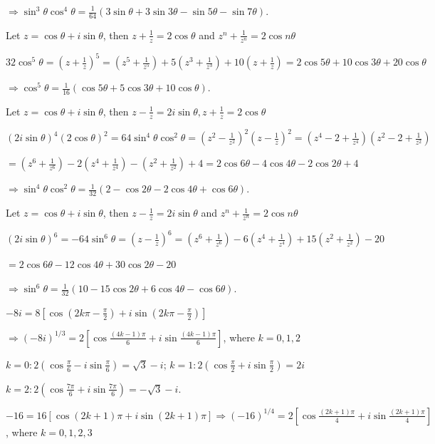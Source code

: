   $\Rightarrow \sin^3\theta\cos^4\theta = \frac{1}{64}(3\sin\theta + 3\sin3\theta - \sin5\theta -
  \sin7\theta)$.
\item Let $z = \cos\theta + i\sin\theta$, then $z + \frac{1}{z} = 2\cos\theta$ and $z^n + \frac{1}{z^n} =
  2\cos n\theta$

  $32\cos^5\theta = \left(z + \frac{1}{z}\right)^5 = \left(z^5 + \frac{1}{z^5}\right) + 5\left(z^3 +
  \frac{1}{z^3}\right) + 10\left(z + \frac{1}{z}\right) = 2\cos5\theta + 10\cos3\theta + 20\cos\theta$

  $\Rightarrow \cos^5\theta = \frac{1}{16}(\cos5\theta + 5\cos3\theta + 10\cos\theta)$.
\item Let $z = \cos\theta + i\sin\theta$, then $z - \frac{1}{z} = 2i\sin\theta, z + \frac{1}{z} =
  2\cos\theta$

  $(2i\sin\theta)^4(2\cos\theta)^2 = 64\sin^4\theta\cos^2\theta = \left(z^2 - \frac{1}{z^2}\right)^2\left(z
  - \frac{1}{z}\right)^2 = \left(z^4 - 2 + \frac{1}{z^4}\right)\left(z^2 - 2 + \frac{1}{z^2}\right)$

  $= \left(z^6 + \frac{1}{z^6}\right) - 2\left(z^4 + \frac{1}{z^4}\right) - \left(z^2 + \frac{1}{z^2}\right)
  + 4 = 2\cos6\theta - 4\cos4\theta - 2\cos2\theta + 4$

  $\Rightarrow \sin^4\theta\cos^2\theta = \frac{1}{32}(2 - \cos2\theta - 2\cos4\theta + \cos6\theta)$.
\item Let $z = \cos\theta + i\sin\theta$, then $z - \frac{1}{z} = 2i\sin\theta$ and $z^n + \frac{1}{z^n} =
  2\cos n\theta$

  $(2i\sin\theta)^6 = -64\sin^6\theta = \left(z - \frac{1}{z}\right)^6 = \left(z^6 + \frac{1}{z^6}\right) -
  6\left(z^4 + \frac{1}{z^4}\right) + 15\left(z^2 + \frac{1}{z^2}\right) - 20$

  $= 2\cos6\theta - 12\cos4\theta + 30\cos2\theta - 20$

  $\Rightarrow \sin^6\theta = \frac{1}{32}(10 - 15\cos2\theta + 6\cos4\theta - \cos6\theta)$.
\item $-8i = 8\left[\cos\left(2k\pi - \frac{\pi}{2}\right) + i\sin\left(2k\pi - \frac{\pi}{2}\right)\right]$

  $\Rightarrow (-8i)^{1/3} = 2\left[\cos\frac{(4k - 1)\pi}{6} + i\sin\frac{(4k - 1)\pi}{6}\right]$, where $k
  = 0, 1, 2$

  $k = 0: 2\left(\cos\frac{\pi}{6} - i\sin\frac{\pi}{6}\right) = \sqrt{3} - i$; $k = 1:
  2\left(\cos\frac{\pi}{2} + i\sin\frac{\pi}{2}\right) = 2i$

  $k = 2: 2\left(\cos\frac{7\pi}{6} + i\sin\frac{7\pi}{6}\right) = -\sqrt{3} - i$.
\item $-16 = 16[\cos(2k + 1)\pi + i\sin(2k + 1)\pi] \Rightarrow (-16)^{1/4} = 2\left[\cos\frac{(2k +
    1)\pi}{4} + i\sin\frac{(2k + 1)\pi}{4}\right]$, where $k = 0, 1, 2, 3$

